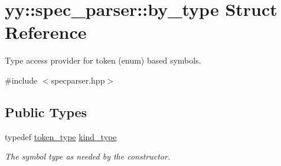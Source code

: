 \hypertarget{structyy_1_1spec__parser_1_1by__type}{}\section{yy\+:\+:spec\+\_\+parser\+:\+:by\+\_\+type Struct Reference}
\label{structyy_1_1spec__parser_1_1by__type}


Type access provider for token (enum) based symbols.  




{\ttfamily \#include $<$specparser.\+hpp$>$}

\subsection*{Public Types}
\begin{DoxyCompactItemize}
\item 
typedef \hyperlink{classyy_1_1spec__parser_aa2d8316e069c6922b83594046e5bdd46}{token\+\_\+type} \hyperlink{structyy_1_1spec__parser_1_1by__type_ab9109b2d2351ec8985490d982685138d}{kind\+\_\+type}\hypertarget{structyy_1_1spec__parser_1_1by__type_ab9109b2d2351ec8985490d982685138d}{}\label{structyy_1_1spec__parser_1_1by__type_ab9109b2d2351ec8985490d982685138d}

\begin{DoxyCompactList}\small\item\em The symbol type as needed by the constructor. \end{DoxyCompactList}\end{DoxyCompactItemize}
